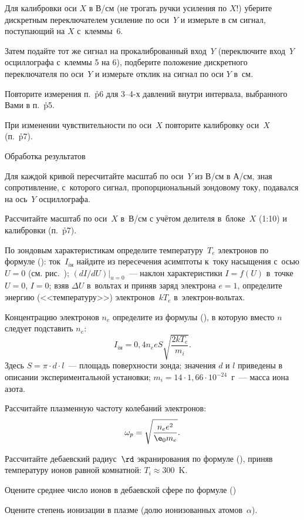 \n[p7] Для калибровки оси $X$ в В/см (не трогать ручки усиления по $X$!) уберите дискретным переключателем усиление по
оси~$Y$ и измерьте в см сигнал, поступающий на $X$ с~клеммы~6.

Затем подайте тот же сигнал на прокалиброванный вход~$Y$ (переключите вход~$Y$ осциллографа с~клеммы 5 на 6), подберите
положение дискретного переключателя по оси~$Y$ и измерьте отклик на сигнал по оси $Y$ в~см.

\n Повторите измерения п.~\r{p6} для 3--4-х давлений внутри интервала, выбранного Вами в п.~\r{p5}.

При изменении чувствительности по оси~$X$ повторите калибровку оси~$X$ (п.~\r{p7}).

\znr Обработка результатов

\n Для каждой кривой пересчитайте масштаб по оси~$Y$ из В/см в А/см, зная сопротивление, с~которого сигнал,
пропорциональный зондовому току, подавался на ось~$Y$ осциллографа.

\n Рассчитайте масштаб по оси~$X$ в~В/см с учётом делителя в~блоке~$X$ (1:10) и калибровки (п.~\r{p7}).

\n По зондовым характеристикам определите температуру~$T_e$ электронов по формуле (): ток~$I_{iн}$ найдите
из пересечения асимптоты к~току насыщения с~осью $U=0$ (см. рис.~); $(dI/dU)|_{u=0}$~--- наклон
характеристики $I=f(U)$ в~точке $U=0$, $I=0$; взяв $\Delta U$ в~вольтах и приняв заряд электрона $e=1$, определите
энергию (<<температуру>>) электронов~$kT_e$ в~электрон-вольтах.

\n Концентрацию электронов $n_e$ определите из формулы (), в которую вместо $n$ следует подставить $n_e$:
\[
I_{iн}=0,4n_e eS\sqrt{\frac{2kT_e}{m_i}}.
\]
Здесь $S=\pi\cdot d\cdot l$~--- площадь поверхности зонда; значения $d$ и $l$ приведены в описании экспериментальной
установки; $m_i=14\cdot 1,66\cdot 10^{-24}$~г~--- масса иона азота.


\n Рассчитайте плазменную частоту колебаний электронов:
\[
\omega_p=\sqrt{\frac{n_e e^2}{\e_0 m_e}}.
\]

\n Рассчитайте дебаевский радиус~$\rd$ экранирования по формуле (), приняв температуру ионов равной
комнатной: $T_i\approx 300$~K.

Оцените среднее число ионов в дебаевской сфере по формуле () %

\n Оцените степень ионизации в плазме (долю ионизованных атомов~$\alpha$).

